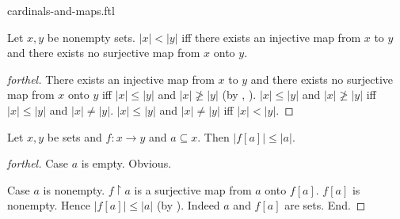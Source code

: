 \documentclass{naproche-library}
\begin{document}
\begin{smodule}{cardinals-and-maps.ftl}
  \begin{proposition}[forthel,id=SET_THEORY_06_5843717288099840]
    Let $x, y$ be nonempty sets.
    $|x| < |y|$ iff there exists an injective map from $x$ to $y$ and there exists no surjective map from $x$ onto $y$.
  \end{proposition}
  \begin{proof}[forthel]
    There exists an injective map from $x$ to $y$ and there exists no surjective map from $x$ onto $y$ iff $|x| \leq |y|$ and $|x| \ngeq |y|$ (by , ).
    $|x| \leq |y|$ and $|x| \ngeq |y|$ iff $|x| \leq |y|$ and $|x| \neq |y|$.
    $|x| \leq |y|$ and $|x| \neq |y|$ iff $|x| < |y|$.
  \end{proof}

  \begin{proposition}[forthel,id=SET_THEORY_06_8113916590686208]
    Let $x, y$ be sets and $f : x \to y$ and $a \subseteq x$.
    Then $|f[a]| \leq |a|$.
  \end{proposition}
  \begin{proof}[forthel]
    Case $a$ is empty. Obvious.

    Case $a$ is nonempty.
      $f \restriction a$ is a surjective map from $a$ onto $f[a]$.
      $f[a]$ is nonempty.
      Hence $|f[a]| \leq |a|$ (by ).
      Indeed $a$ and $f[a]$ are sets.
    End.
  \end{proof}
\end{smodule}
\end{document}
